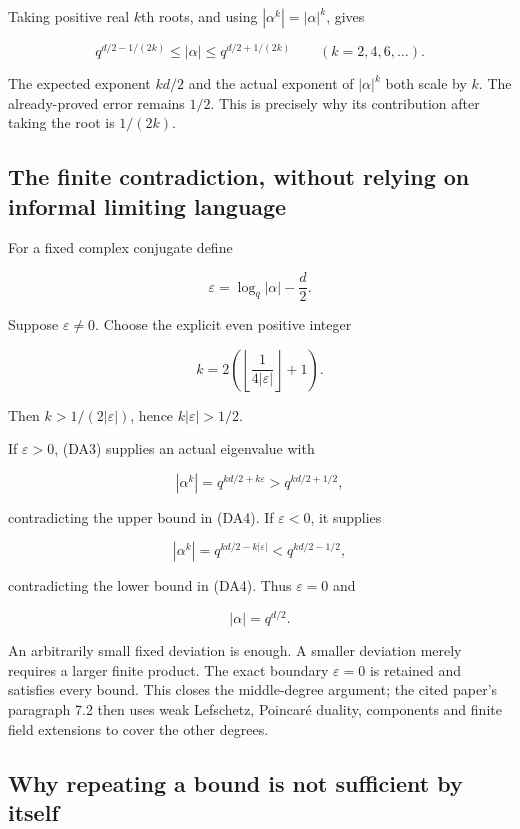 Taking positive real \(k\)th roots, and using \(|\alpha^k|=|\alpha|^k\),
gives

\[q^{d/2-1/(2k)}\le |\alpha|\le q^{d/2+1/(2k)}
\qquad(k=2,4,6,\ldots).\tag{DA5}\]

The expected exponent \(kd/2\) and the actual exponent of \(|\alpha|^k\)
both scale by \(k\). The already-proved error remains \(1/2\). This is
precisely why its contribution after taking the root is \(1/(2k)\).

\subsection{The finite contradiction, without relying on informal
limiting
language}\label{CFStage:the-finite-contradiction-without-relying-on-informal-limiting-language}

For a fixed complex conjugate define

\[\varepsilon=\log_q|\alpha|-\frac d2.\]

Suppose \(\varepsilon\ne0\). Choose the explicit even positive integer

\[k=2\left(\left\lfloor\frac{1}{4|\varepsilon|}\right\rfloor+1\right).
\tag{DA6}\]

Then \(k>1/(2|\varepsilon|)\), hence \(k|\varepsilon|>1/2\).

If \(\varepsilon>0\), (DA3) supplies an actual eigenvalue with

\[|\alpha^k|=q^{kd/2+k\varepsilon}>q^{kd/2+1/2},\]

contradicting the upper bound in (DA4). If \(\varepsilon<0\), it
supplies

\[|\alpha^k|=q^{kd/2-k|\varepsilon|}<q^{kd/2-1/2},\]

contradicting the lower bound in (DA4). Thus \(\varepsilon=0\) and

\[\boxed{|\alpha|=q^{d/2}.}\tag{DA7}\]

An arbitrarily small fixed deviation is enough. A smaller deviation
merely requires a larger finite product. The exact boundary
\(\varepsilon=0\) is retained and satisfies every bound. This closes the
middle-degree argument; the cited paper's paragraph 7.2 then uses weak
Lefschetz, Poincaré duality, components and finite field extensions to
cover the other degrees.

\subsection{Why repeating a bound is not sufficient by
itself}\label{CFStage:why-repeating-a-bound-is-not-sufficient-by-itself}

